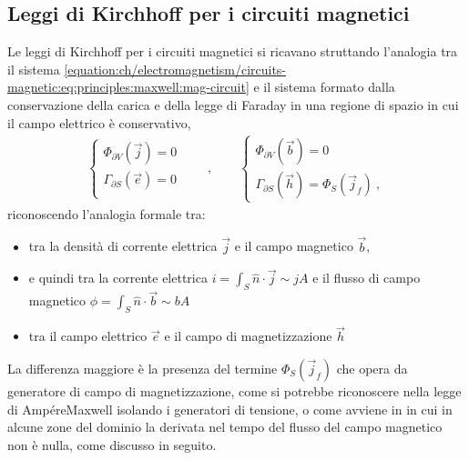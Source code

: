 \documentclass[letterpaper,10pt,italian]{jupyterBook}
\begin{document}
\subsection{Leggi di Kirchhoff per i circuiti magnetici}
\label{\detokenize{ch/electromagnetism/circuits-magnetic:leggi-di-kirchhoff-per-i-circuiti-magnetici}}\label{\detokenize{ch/electromagnetism/circuits-magnetic:physics-hs-electromagnetism-circuits-magnetic-kirchhoff-laws}}
\sphinxAtStartPar
Le leggi di Kirchhoff per i circuiti magnetici si ricavano struttando l’analogia tra il sistema \eqref{equation:ch/electromagnetism/circuits-magnetic:eq:principles:maxwell:mag-circuit} e il sistema formato dalla conservazione della carica e della legge di Faraday in una regione di spazio in cui il campo elettrico è conservativo,
\begin{equation*}
\begin{split}
\begin{cases}
  \Phi_{\partial V}(\vec{j}) = 0 \\
  \Gamma_{\partial S}(\vec{e}) = 0 \\
\end{cases}
\qquad , \qquad
\begin{cases}
  \Phi_{\partial V}(\vec{b}) = 0 \\
  \Gamma_{\partial S}(\vec{h}) = \Phi_S(\vec{j}_f) \ ,
\end{cases}
\end{split}
\end{equation*}
\sphinxAtStartPar
riconoscendo l’analogia formale tra:
\begin{itemize}
\item {} 
\sphinxAtStartPar
tra la densità di corrente elettrica \(\vec{j}\) e il campo magnetico \(\vec{b}\),

\item {} 
\sphinxAtStartPar
e quindi tra la corrente elettrica \(i = \int_S \hat{n} \cdot \vec{j} \sim j A\) e il flusso di campo magnetico \(\phi = \int_{S} \hat{n} \cdot \vec{b} \sim b A\)

\item {} 
\sphinxAtStartPar
tra il campo elettrico \(\vec{e}\) e il campo di magnetizzazione \(\vec{h}\)

\end{itemize}

\sphinxAtStartPar
La differenza maggiore è la presenza del termine \(\Phi_S(\vec{j}_f)\) che opera da generatore di campo di magnetizzazione, come si potrebbe riconoscere nella legge di Ampére\sphinxhyphen{}Maxwell isolando i generatori di tensione, o come avviene in {\hyperref[\detokenize{ch/electromagnetism/electric-machines:physics-hs-electromagnetism-electric-machines}]{}} in cui in alcune zone del dominio la derivata nel tempo del flusso del campo magnetico non è nulla, come discusso in seguito.
\end{document}
